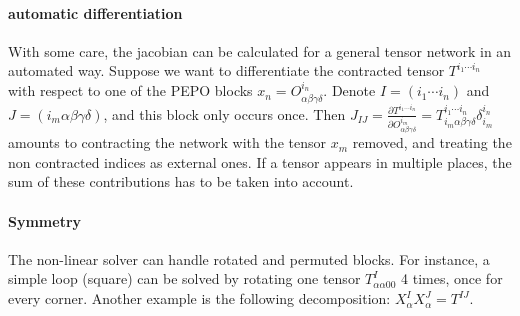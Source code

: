 \paragraph{automatic differentiation}
With some care, the jacobian can be calculated for a general tensor network in an automated way. Suppose we want to differentiate the contracted tensor $T^{i_1  \cdots i_n  }$ with respect to one of the PEPO blocks $x_n = O^{i_n }_{\alpha \beta \gamma \delta}$. Denote $I=(i_1 \cdots i_n )$ and $J=(i_m  \alpha \beta \gamma \delta)$, and this block only occurs once. Then $  J_{I J}  = \frac{\partial T^{i_1  \cdots i_n  } }{  \partial O^{i_m }_{\alpha \beta \gamma \delta} } = T^{i_1 \cdots i_n } _{ i_m  \alpha \beta \gamma \delta}  \delta^{i_n}_{i_m}   $  amounts to  contracting the network with the tensor $x_m$ removed, and treating the non contracted indices as external ones. If a tensor appears in multiple places, the sum of these contributions has to be taken into account.


\paragraph{Symmetry}

The non-linear solver can handle rotated and permuted blocks. For instance, a simple loop (square) can be solved by rotating one tensor $T^I_{ \alpha \alpha 0 0}$ 4 times, once for every corner. Another example is the following decomposition:  $  X^I_\alpha X^J_\alpha = T^{I J} $.

